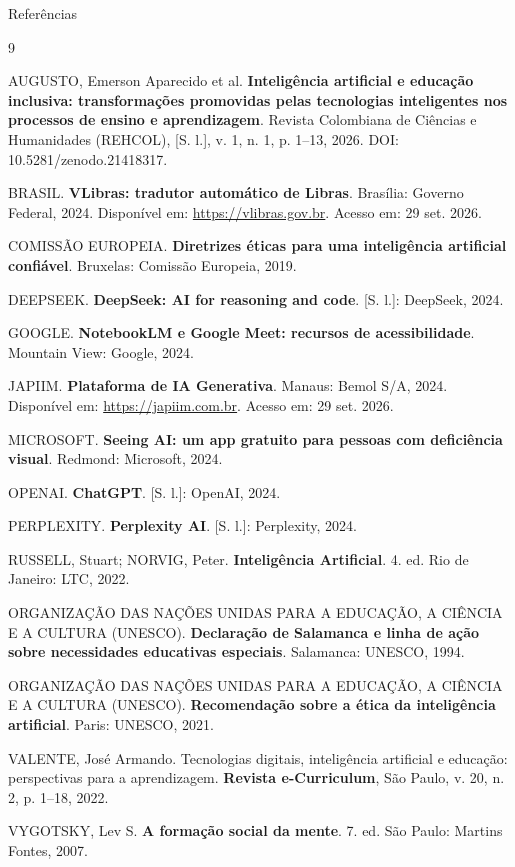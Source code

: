 \documentclass[11pt]{beamer}
\begin{document}
	\begin{frame}[allowframebreaks]{Referências}
		\footnotesize
		\begin{thebibliography}{9}
			
			AUGUSTO, Emerson Aparecido et al. \textbf{Inteligência artificial e educação inclusiva: transformações promovidas pelas tecnologias inteligentes nos processos de ensino e aprendizagem}. Revista Colombiana de Ciências e Humanidades (REHCOL), [S. l.], v. 1, n. 1, p. 1--13, 2026. DOI: 10.5281/zenodo.21418317.
			
			BRASIL. \textbf{VLibras: tradutor automático de Libras}. Brasília: Governo Federal, 2024. Disponível em: \url{https://vlibras.gov.br}. Acesso em: 29 set. 2026.
			
			COMISSÃO EUROPEIA. \textbf{Diretrizes éticas para uma inteligência artificial confiável}. Bruxelas: Comissão Europeia, 2019.
			
			DEEPSEEK. \textbf{DeepSeek: AI for reasoning and code}. [S. l.]: DeepSeek, 2024.
			
			GOOGLE. \textbf{NotebookLM e Google Meet: recursos de acessibilidade}. Mountain View: Google, 2024.
			
			JAPIIM. \textbf{Plataforma de IA Generativa}. Manaus: Bemol S/A, 2024. Disponível em: \url{https://japiim.com.br}. Acesso em: 29 set. 2026.
			
			MICROSOFT. \textbf{Seeing AI: um app gratuito para pessoas com deficiência visual}. Redmond: Microsoft, 2024.
			
			OPENAI. \textbf{ChatGPT}. [S. l.]: OpenAI, 2024.
			
			PERPLEXITY. \textbf{Perplexity AI}. [S. l.]: Perplexity, 2024.
			
			RUSSELL, Stuart; NORVIG, Peter. \textbf{Inteligência Artificial}. 4. ed. Rio de Janeiro: LTC, 2022.
			
			ORGANIZAÇÃO DAS NAÇÕES UNIDAS PARA A EDUCAÇÃO, A CIÊNCIA E A CULTURA (UNESCO). \textbf{Declaração de Salamanca e linha de ação sobre necessidades educativas especiais}. Salamanca: UNESCO, 1994.
			
			ORGANIZAÇÃO DAS NAÇÕES UNIDAS PARA A EDUCAÇÃO, A CIÊNCIA E A CULTURA (UNESCO). \textbf{Recomendação sobre a ética da inteligência artificial}. Paris: UNESCO, 2021.
			
			VALENTE, José Armando. Tecnologias digitais, inteligência artificial e educação: perspectivas para a aprendizagem. \textbf{Revista e-Curriculum}, São Paulo, v. 20, n. 2, p. 1--18, 2022.
			
			VYGOTSKY, Lev S. \textbf{A formação social da mente}. 7. ed. São Paulo: Martins Fontes, 2007.
			
		\end{thebibliography}
	\end{frame}
	
\end{document}
